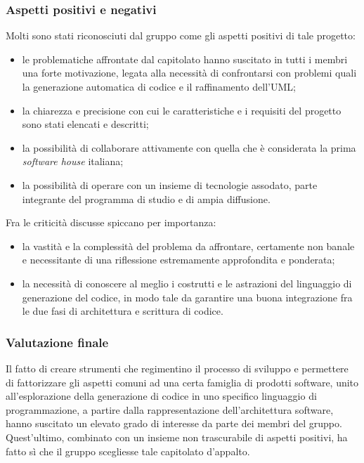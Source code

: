 		\subsubsection{Aspetti positivi e negativi}
		Molti sono stati riconosciuti dal gruppo come gli aspetti positivi di tale progetto:
		\begin{itemize}
			\item le problematiche affrontate dal capitolato hanno suscitato in tutti i membri una forte motivazione, legata alla necessità di confrontarsi 
			con problemi quali la generazione automatica di codice e il raffinamento dell'UML;
			\item la chiarezza e precisione con cui le caratteristiche e i requisiti del progetto sono stati elencati e descritti;
			\item la possibilità di collaborare attivamente con quella che è considerata 
			la prima \emph{software house} italiana;
			\item la possibilità di operare con un insieme di tecnologie assodato, parte integrante del programma di studio e di ampia diffusione.
		\end{itemize}
		Fra le criticità discusse spiccano per importanza:
		\begin{itemize}
			\item la vastità e la complessità del problema da affrontare, certamente non banale e necessitante di una riflessione 
			estremamente approfondita e ponderata;
			\item la necessità di conoscere al meglio i costrutti e le astrazioni del linguaggio di generazione del codice, 
			in modo tale da garantire una buona integrazione fra le due fasi di architettura e scrittura di codice.
		\end{itemize}
		\subsubsection{Valutazione finale} 
		Il fatto di creare strumenti che regimentino il processo di sviluppo e permettere di fattorizzare gli aspetti comuni ad una certa famiglia di 
		prodotti software, unito all'esplorazione della generazione di codice in uno specifico linguaggio di programmazione, a partire dalla rappresentazione 
		dell'architettura software, hanno suscitato un elevato grado di interesse da parte dei membri del gruppo. Quest'ultimo, combinato con un insieme non 
		trascurabile di aspetti positivi, ha fatto sì che il gruppo \hx{} scegliesse tale capitolato d'appalto.
	

